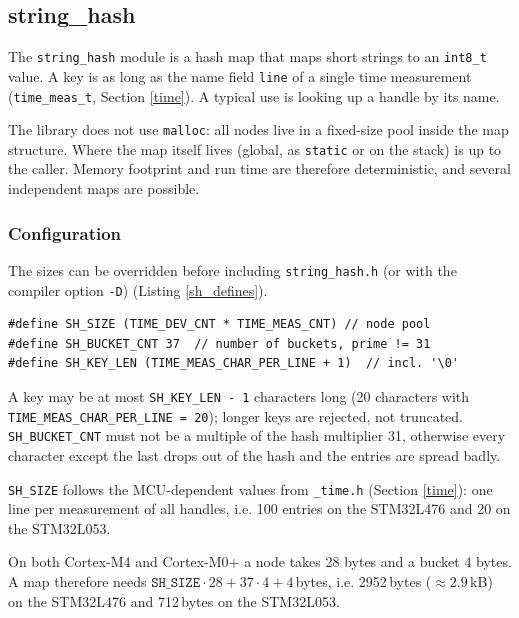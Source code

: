 \subsection{string\_hash}\label{string_hash}
The \verb|string_hash| module is a hash map that maps short strings to an
\verb|int8_t| value. A key is as long as the name field \verb|line| of a single
time measurement (\verb|time_meas_t|, Section \ref{time}). A
typical use is looking up a handle by its name.

The library does not use \verb|malloc|: all nodes live in a fixed-size pool
inside the map structure. Where the map itself lives (global, as
\verb|static| or on the stack) is up to the caller. Memory footprint and run
time are therefore deterministic, and several independent maps are possible.

\subsubsection*{Configuration}
The sizes can be overridden before including \verb|string_hash.h| (or with
the compiler option \verb|-D|) (Listing \ref{sh_defines}).

\begin{listing}[H]
\begin{verbatim}
#define SH_SIZE (TIME_DEV_CNT * TIME_MEAS_CNT) // node pool
#define SH_BUCKET_CNT 37  // number of buckets, prime != 31
#define SH_KEY_LEN (TIME_MEAS_CHAR_PER_LINE + 1)  // incl. '\0'
\end{verbatim}
\caption{Configuration of \texttt{string\_hash}}
\label{sh_defines}
\end{listing}

A key may be at most \verb|SH_KEY_LEN - 1| characters long (20 characters
with \verb|TIME_MEAS_CHAR_PER_LINE = 20|); longer keys are rejected, not
truncated. \verb|SH_BUCKET_CNT| must not be a multiple of the hash multiplier
31, otherwise every character except the last drops out of the hash and the
entries are spread badly.

\verb|SH_SIZE| follows the MCU-dependent values from \verb|_time.h|
(Section \ref{time}): one line per measurement of all handles, i.e. 100
entries on the STM32L476 and 20 on the STM32L053.

On both Cortex-M4 and Cortex-M0+ a node takes 28 bytes and a bucket 4 bytes.
A map therefore needs $\mathtt{SH\_SIZE} \cdot 28 + 37 \cdot 4 + 4$\,bytes,
i.e. 2952\,bytes ($\approx 2.9$\,kB) on the STM32L476 and 712\,bytes on
the STM32L053.


